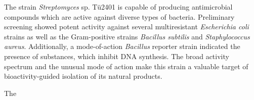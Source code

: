 



% 







The strain \textit{Streptomyces} sp. Tü2401 is capable of producing antimicrobial compounds which are active against diverse types of bacteria. Preliminary screening showed potent activity against several multiresistant \textit{Escherichia coli} strains as well as the Gram-positive strains \textit{Bacillus subtilis} and \textit{Staphylococcus aureus}. Additionally, a mode-of-action \textit{Bacillus} reporter strain indicated the presence of substances, which inhibit DNA synthesis. The broad activity spectrum and the unusual mode of action make this strain a valuable target of bioactivity-guided isolation of its natural products.

The



